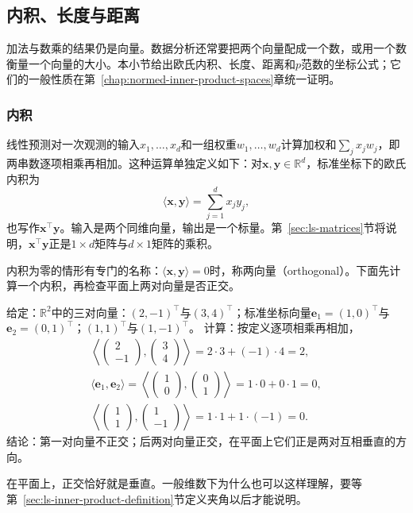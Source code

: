 \subsection{内积、长度与距离}

加法与数乘的结果仍是向量。数据分析还常要把两个向量配成一个数，或用一个数衡量一个向量的大小。本小节给出欧氏内积、长度、距离和$p$范数的坐标公式；它们的一般性质在第~\ref{chap:normed-inner-product-spaces}章统一证明。

\subsubsection{内积}
\label{sec:ls-inner-products}
\label{sec:prelim-vector-inner-length}

线性预测对一次观测的输入$x_1,\ldots,x_d$和一组权重$w_1,\ldots,w_d$计算加权和$\sum_jx_jw_j$，即两串数逐项相乘再相加。这种运算单独定义如下：对$\bm x,\bm y\in\mathbb R^d$，标准坐标下的欧氏内积为
\[
 \langle\bm x,\bm y\rangle
 =\sum_{j=1}^d x_jy_j,
\]
也写作$\bm x^\top\bm y$。输入是两个同维向量，输出是一个标量。第~\ref{sec:ls-matrices}节将说明，$\bm x^\top\bm y$正是$1\times d$矩阵与$d\times1$矩阵的乘积。

内积为零的情形有专门的名称：$\langle\bm x,\bm y\rangle=0$时，称两向量（orthogonal）。下面先计算一个内积，再检查平面上两对向量是否正交。
\begin{example}[内积与正交的计算]
\label{ex:ls-inner-product-orthogonality}
给定：$\mathbb R^2$中的三对向量：$(2,-1)^\top$与$(3,4)^\top$；标准坐标向量$\bm e_1=(1,0)^\top$与$\bm e_2=(0,1)^\top$；$(1,1)^\top$与$(1,-1)^\top$。
计算：按定义逐项相乘再相加，
\[
 \begin{gathered}
 \left\langle\begin{pmatrix}2\\-1\end{pmatrix},\begin{pmatrix}3\\4\end{pmatrix}\right\rangle=2\cdot3+(-1)\cdot4=2,\\
 \langle\bm e_1,\bm e_2\rangle=\left\langle\begin{pmatrix}1\\0\end{pmatrix},\begin{pmatrix}0\\1\end{pmatrix}\right\rangle=1\cdot0+0\cdot1=0,\\
 \left\langle\begin{pmatrix}1\\1\end{pmatrix},\begin{pmatrix}1\\-1\end{pmatrix}\right\rangle=1\cdot1+1\cdot(-1)=0.
 \end{gathered}
\]
结论：第一对向量不正交；后两对向量正交，在平面上它们正是两对互相垂直的方向。
\end{example}
在平面上，正交恰好就是垂直。一般维数下为什么也可以这样理解，要等第~\ref{sec:ls-inner-product-definition}节定义夹角以后才能说明。

